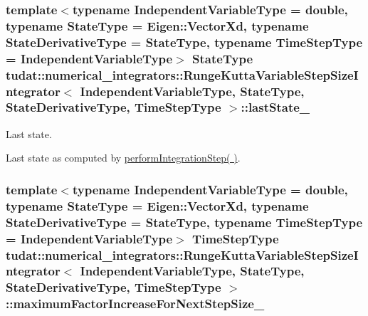 \subsubsection[{\texorpdfstring{last\+State\+\_\+}{lastState_}}]{\setlength{\rightskip}{0pt plus 5cm}template$<$typename Independent\+Variable\+Type  = double, typename State\+Type  = Eigen\+::\+Vector\+Xd, typename State\+Derivative\+Type  = State\+Type, typename Time\+Step\+Type  = Independent\+Variable\+Type$>$ State\+Type {\bf tudat\+::numerical\+\_\+integrators\+::\+Runge\+Kutta\+Variable\+Step\+Size\+Integrator}$<$ Independent\+Variable\+Type, State\+Type, State\+Derivative\+Type, Time\+Step\+Type $>$\+::last\+State\+\_\+\hspace{0.3cm}{\ttfamily [protected]}}\hypertarget{classtudat_1_1numerical__integrators_1_1RungeKuttaVariableStepSizeIntegrator_a745206698dbef0aa6f9b8ac959be2d03}{}\label{classtudat_1_1numerical__integrators_1_1RungeKuttaVariableStepSizeIntegrator_a745206698dbef0aa6f9b8ac959be2d03}


Last state. 

Last state as computed by \hyperlink{classtudat_1_1numerical__integrators_1_1RungeKuttaVariableStepSizeIntegrator_a34e884253297c9bfb17d756c36510cc4}{perform\+Integration\+Step( )}. 
\subsubsection[{\texorpdfstring{maximum\+Factor\+Increase\+For\+Next\+Step\+Size\+\_\+}{maximumFactorIncreaseForNextStepSize_}}]{\setlength{\rightskip}{0pt plus 5cm}template$<$typename Independent\+Variable\+Type  = double, typename State\+Type  = Eigen\+::\+Vector\+Xd, typename State\+Derivative\+Type  = State\+Type, typename Time\+Step\+Type  = Independent\+Variable\+Type$>$ Time\+Step\+Type {\bf tudat\+::numerical\+\_\+integrators\+::\+Runge\+Kutta\+Variable\+Step\+Size\+Integrator}$<$ Independent\+Variable\+Type, State\+Type, State\+Derivative\+Type, Time\+Step\+Type $>$\+::maximum\+Factor\+Increase\+For\+Next\+Step\+Size\+\_\+\hspace{0.3cm}{\ttfamily [protected]}}\hypertarget{classtudat_1_1numerical__integrators_1_1RungeKuttaVariableStepSizeIntegrator_ab8745acd627400550b7e00c1ba6c12dd}{}\label{classtudat_1_1numerical__integrators_1_1RungeKuttaVariableStepSizeIntegrator_ab8745acd627400550b7e00c1ba6c12dd}


